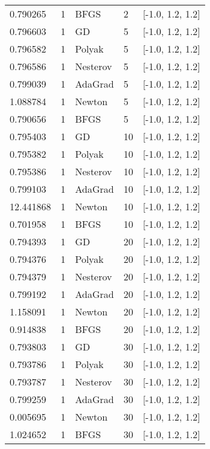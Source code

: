 \begin{tabular}{lllll}
  0.790265 &        1 &     BFGS &      2 & [-1.0, 1.2, 1.2] \\
  0.796603 &        1 &       GD &      5 & [-1.0, 1.2, 1.2] \\
  0.796582 &        1 &   Polyak &      5 & [-1.0, 1.2, 1.2] \\
  0.796586 &        1 & Nesterov &      5 & [-1.0, 1.2, 1.2] \\
  0.799039 &        1 &  AdaGrad &      5 & [-1.0, 1.2, 1.2] \\
  1.088784 &        1 &   Newton &      5 & [-1.0, 1.2, 1.2] \\
  0.790656 &        1 &     BFGS &      5 & [-1.0, 1.2, 1.2] \\
  0.795403 &        1 &       GD &     10 & [-1.0, 1.2, 1.2] \\
  0.795382 &        1 &   Polyak &     10 & [-1.0, 1.2, 1.2] \\
  0.795386 &        1 & Nesterov &     10 & [-1.0, 1.2, 1.2] \\
  0.799103 &        1 &  AdaGrad &     10 & [-1.0, 1.2, 1.2] \\
 12.441868 &        1 &   Newton &     10 & [-1.0, 1.2, 1.2] \\
  0.701958 &        1 &     BFGS &     10 & [-1.0, 1.2, 1.2] \\
  0.794393 &        1 &       GD &     20 & [-1.0, 1.2, 1.2] \\
  0.794376 &        1 &   Polyak &     20 & [-1.0, 1.2, 1.2] \\
  0.794379 &        1 & Nesterov &     20 & [-1.0, 1.2, 1.2] \\
  0.799192 &        1 &  AdaGrad &     20 & [-1.0, 1.2, 1.2] \\
  1.158091 &        1 &   Newton &     20 & [-1.0, 1.2, 1.2] \\
  0.914838 &        1 &     BFGS &     20 & [-1.0, 1.2, 1.2] \\
  0.793803 &        1 &       GD &     30 & [-1.0, 1.2, 1.2] \\
  0.793786 &        1 &   Polyak &     30 & [-1.0, 1.2, 1.2] \\
  0.793787 &        1 & Nesterov &     30 & [-1.0, 1.2, 1.2] \\
  0.799259 &        1 &  AdaGrad &     30 & [-1.0, 1.2, 1.2] \\
  0.005695 &        1 &   Newton &     30 & [-1.0, 1.2, 1.2] \\
  1.024652 &        1 &     BFGS &     30 & [-1.0, 1.2, 1.2] \\

\end{tabular}
